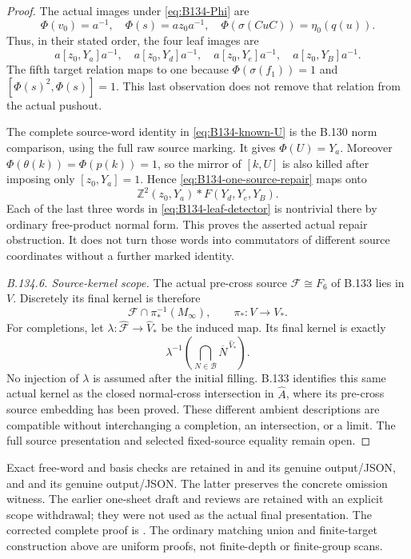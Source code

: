 \begin{proof}
The actual images under \eqref{eq:B134-Phi} are
\[
 \Phi(v_0)=a^{-1},\quad\Phi(s)=az_0a^{-1},\quad
 \Phi(\sigma(CuC))=\eta_0(q(u)).
\]
Thus, in their stated order, the four leaf images are
\begin{equation}\label{eq:B134-leaf-detector}
 a[z_0,Y_a]a^{-1},\quad a[z_0,Y_d]a^{-1},\quad
 a[z_0,Y_e]a^{-1},\quad a[z_0,Y_B]a^{-1}.
\end{equation}
The fifth target relation maps to one because
$\Phi(\sigma(f_1))=1$ and $[\Phi(s)^2,\Phi(s)]=1$.
This last observation does not remove that relation from
the actual pushout.

The complete source-word identity in
\eqref{eq:B134-known-U} is the B.130 norm comparison,
using the full raw source marking. It gives $\Phi(U)=Y_a$.
Moreover $\Phi(\theta(k))=\Phi(p(k))=1$, so the mirror of
$[k,U]$ is also killed after imposing only $[z_0,Y_a]=1$.
Hence \eqref{eq:B134-one-source-repair} maps onto
\[
 \mathbb Z^2(z_0,Y_a)*F(Y_d,Y_e,Y_B).
\]
Each of the last three words in \eqref{eq:B134-leaf-detector}
is nontrivial there by ordinary free-product normal form.
This proves the asserted actual repair obstruction. It does
not turn those words into commutators of different source
coordinates without a further marked identity.

\emph{B.134.6. Source-kernel scope.}
The actual pre-cross source $\mathscr F\cong F_6$ of B.133
lies in $V$. Discretely its final kernel is therefore
\[
 \mathscr F\cap\pi_*^{-1}(M_\infty),\qquad
 \pi_*:V\longrightarrow V_*.
\]
For completions, let $\lambda:\widehat{\mathscr F}\to
\widehat V_*$ be the induced map. Its final kernel is exactly
\[
 \lambda^{-1}\!\left(
     \bigcap_{N\in\mathcal B}\overline N^{\,\widehat V_*}
                   \right).
\]
No injection of $\lambda$ is assumed after the initial filling.
B.133 identifies this same actual kernel as the closed
normal-cross intersection in $\widehat A$, where its pre-cross
source embedding has been proved. These different ambient
descriptions are compatible without interchanging a completion,
an intersection, or a limit. The full source presentation and
selected fixed-source equality remain open.
\end{proof}

\begingroup\raggedright\footnotesize
Exact free-word and basis checks are retained in
and its genuine output/JSON, and
and its genuine output/JSON. The latter preserves the concrete
omission witness. The earlier one-sheet draft and reviews are
retained with an explicit scope withdrawal; they were not used
as the actual final presentation. The corrected complete proof is
.
The ordinary matching union and finite-target construction above
are uniform proofs, not finite-depth or finite-group scans.
\par\endgroup
